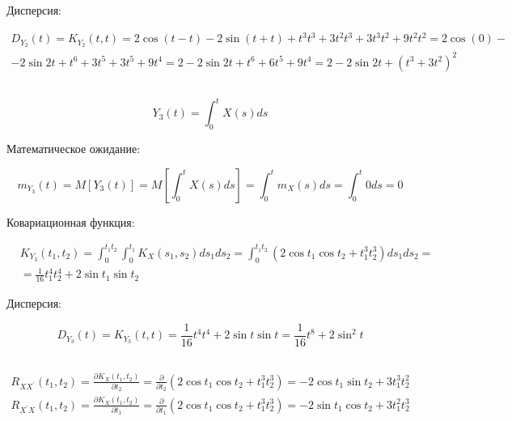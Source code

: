 \documentclass[12 pt]{article}
\begin{document}
Дисперсия:

\begin{equation}
	\begin{array}{l}
	D_{Y_{2}}(t)=K_{Y_{2}}(t, t)=2 \cos (t-t)-2 \sin (t+t)+t^{3} t^{3}+3 t^{2} t^{3}+3 t^{3} t^{2}+9 t^{2} t^{2}=2 \cos (0)- \\
	-2 \sin 2 t+t^{6}+3 t^{5}+3 t^{5}+9 t^{4}=2-2 \sin 2 t+t^{6}+6 t^{5}+9 t^{4}=2-2 \sin 2 t+\left(t^{3}+3 t^{2}\right)^{2}
	\end{array}
\end{equation}

\newpage
\subsection{}

\begin{equation}
	Y_3(t) = \int_{0}^{t}X(s)ds
\end{equation}


Математическое ожидание:

\begin{equation}
	m_{Y_{3}}(t)=M\left[Y_{3}(t)\right]=M\left[\int_{0}^{t} X(s) d s\right]=\int_{0}^{t} m_{X}(s) d s=\int_{0}^{t} 0 d s=0
\end{equation}


Ковариационная функция:

\begin{equation}
	\begin{aligned}
	&K_{Y_{3}}\left(t_{1}, t_{2}\right)=\int_{0}^{t_{1} t_{2}} \int_{0}^{t_{1}} K_{X}\left(s_{1}, s_{2}\right) d s_{1} d s_{2}=\int_{0}^{t_{1} t_{2}}\left(2 \cos t_{1} \cos t_{2}+t_{1}^{3} t_{2}^{3}\right) d s_{1} d s_{2}=\\
	&=\frac{1}{16} t_{1}^{4} t_{2}^{4}+2 \sin t_{1} \sin t_{2}
	\end{aligned}
\end{equation}


Дисперсия:

\begin{equation}
	D_{Y_{3}}(t)=K_{Y_{3}}(t, t)=\frac{1}{16} t^{4} t^{4}+2 \sin t \sin t=\frac{1}{16} t^{8}+2 \sin ^{2} t
\end{equation}

\newpage
\subsection{}

\begin{equation}
	\begin{array}{c}
	R_{X X^{\prime}}\left(t_{1}, t_{2}\right)=\frac{\partial K_{X}\left(t_{1}, t_{2}\right)}{\partial t_{2}}=\frac{\partial}{\partial t_{2}}\left(2 \cos t_{1} \cos t_{2}+t_{1}^{3} t_{2}^{3}\right)=-2 \cos t_{1} \sin t_{2}+3 t_{1}^{3} t_{2}^{2} \\
	R_{X^{\prime} X}\left(t_{1}, t_{2}\right)=\frac{\partial K_{X}\left(t_{1}, t_{2}\right)}{\partial t_{1}}=\frac{\partial}{\partial t_{1}}\left(2 \cos t_{1} \cos t_{2}+t_{1}^{3} t_{2}^{3}\right)=-2 \sin t_{1} \cos t_{2}+3 t_{1}^{2} t_{2}^{3}
	\end{array}
\end{equation}
\end{document}
